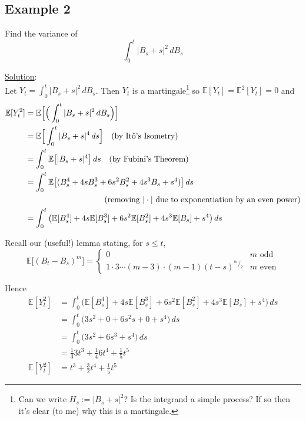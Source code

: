 \documentclass[12pt]{article}
\begin{document}
\subsection{Example 2}

Find the variance of 
\begin{equation*}
	\int^t_0|B_s + s|^2\,dB_s
\end{equation*}

\underline{Solution}: \\

Let $Y_t = 	\int^t_0|B_s + s|^2\,dB_s$. Then $Y_t$ is a martingale\footnote{Can we write $H_s := |B_s + s|^2$? Is the integrand a simple process? If so then it's clear (to me) why this is a martingale.} so $\mathbb E[Y_t] = \mathbb E^2[Y_t] = 0$ and
\begin{align*}
	\mathbb E[Y^2_t] &= \mathbb E\Big[\Big(\int^t_0 |B_s + s|^2\,dB_s\Big)\Big] \\
	&= \mathbb E\Big[\int^t_0 |B_s + s|^4\,ds\Big] \quad \text{(by It\^{o}'s Isometry)} \\
	&= \int^t_0\mathbb E\big[|B_s + s|^4\big]\,ds \quad \text{(by Fubini's Theorem)} \\
	&= \int^t_0 \mathbb E\big[(B_s^4 + 4sB_s^3 + 6s^2B_s^2 + 4s^3B_s + s^4)\big]\,ds \\
	&\hphantom{{}={\int^t_0 \mathbb E\big[(B_s^4 + 4sB_s^3 + }} \text{(removing $|\cdot|$ due to exponentiation by an even power)} \\
	&= \int^t_0 \big(\mathbb E[B_s^4] + 4s\mathbb E[B_s^3] + 6s^2\mathbb E[B_s^2] + 4s^3\mathbb E[B_s] + s^4\big)\,ds
\end{align*}

Recall our (useful!) lemma stating, for $s \leq t$,
\begin{equation*}
	\mathbb E\big[(B_t - B_s)^m\big] = 
	\begin{cases}
	0 & m \text{ odd}\\
	1\cdot3\cdots(m-3)\cdot(m-1)(t-s)^{^m/_2} & m \text{ even}
	\end{cases}
\end{equation*}

Hence
\begin{align*}
	\mathbb E[Y_t^2] &= \int^t_0 \big(\mathbb E[B_s^4] + 4s\mathbb E[B_s^3] + 6s^2\mathbb E[B_s^2] + 4s^3\mathbb E[B_s] + s^4\big)\,ds \\
	&= \int^t_0 \big(3s^2 + 0 + 6s^2s + 0 + s^4\big)\,ds \\
	&= \int^t_0 \big(3s^2 + 6s^3 + s^4\big)\,ds \\
	&= \frac{1}{3}3t^3 + \frac{1}{4}6t^4 + \frac{1}{5}t^5 \\
	\mathbb E[Y_t^2] &= t^3 + \frac{3}{2}t^4 + \frac{1}{5}t^5
\end{align*}
\end{document}
